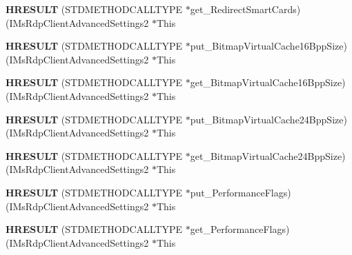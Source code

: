 \begin{DoxyCompactItemize}
{\bfseries H\+R\+E\+S\+U\+LT} (S\+T\+D\+M\+E\+T\+H\+O\+D\+C\+A\+L\+L\+T\+Y\+PE $\ast$get\+\_\+\+Redirect\+Smart\+Cards)(I\+Ms\+Rdp\+Client\+Advanced\+Settings2 $\ast$This
\item 
\mbox{\label{struct_i_ms_rdp_client_advanced_settings2_vtbl_aaad2b02768103ba351983180f8139921}} 
{\bfseries H\+R\+E\+S\+U\+LT} (S\+T\+D\+M\+E\+T\+H\+O\+D\+C\+A\+L\+L\+T\+Y\+PE $\ast$put\+\_\+\+Bitmap\+Virtual\+Cache16\+Bpp\+Size)(I\+Ms\+Rdp\+Client\+Advanced\+Settings2 $\ast$This
\item 
\mbox{\label{struct_i_ms_rdp_client_advanced_settings2_vtbl_a3a6d8b6e032e56c0f9f1d7b60e688c1d}} 
{\bfseries H\+R\+E\+S\+U\+LT} (S\+T\+D\+M\+E\+T\+H\+O\+D\+C\+A\+L\+L\+T\+Y\+PE $\ast$get\+\_\+\+Bitmap\+Virtual\+Cache16\+Bpp\+Size)(I\+Ms\+Rdp\+Client\+Advanced\+Settings2 $\ast$This
\item 
\mbox{\label{struct_i_ms_rdp_client_advanced_settings2_vtbl_a7984f81af2ea584553aa61c26a0feeb3}} 
{\bfseries H\+R\+E\+S\+U\+LT} (S\+T\+D\+M\+E\+T\+H\+O\+D\+C\+A\+L\+L\+T\+Y\+PE $\ast$put\+\_\+\+Bitmap\+Virtual\+Cache24\+Bpp\+Size)(I\+Ms\+Rdp\+Client\+Advanced\+Settings2 $\ast$This
\item 
\mbox{\label{struct_i_ms_rdp_client_advanced_settings2_vtbl_a4adbbdd9b9d97141fad26a3c06655156}} 
{\bfseries H\+R\+E\+S\+U\+LT} (S\+T\+D\+M\+E\+T\+H\+O\+D\+C\+A\+L\+L\+T\+Y\+PE $\ast$get\+\_\+\+Bitmap\+Virtual\+Cache24\+Bpp\+Size)(I\+Ms\+Rdp\+Client\+Advanced\+Settings2 $\ast$This
\item 
\mbox{\label{struct_i_ms_rdp_client_advanced_settings2_vtbl_a99959d173a0c2a5512e46c364d3403da}} 
{\bfseries H\+R\+E\+S\+U\+LT} (S\+T\+D\+M\+E\+T\+H\+O\+D\+C\+A\+L\+L\+T\+Y\+PE $\ast$put\+\_\+\+Performance\+Flags)(I\+Ms\+Rdp\+Client\+Advanced\+Settings2 $\ast$This
\item 
\mbox{\label{struct_i_ms_rdp_client_advanced_settings2_vtbl_a5dab500826fb3d7edb02986cd5958ca6}} 
{\bfseries H\+R\+E\+S\+U\+LT} (S\+T\+D\+M\+E\+T\+H\+O\+D\+C\+A\+L\+L\+T\+Y\+PE $\ast$get\+\_\+\+Performance\+Flags)(I\+Ms\+Rdp\+Client\+Advanced\+Settings2 $\ast$This

\end{DoxyCompactItemize}
